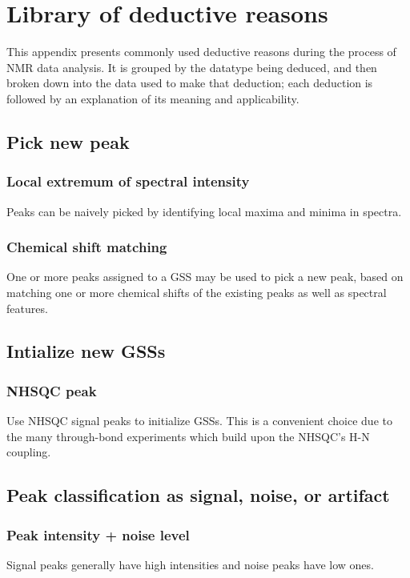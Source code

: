\chapter{Library of deductive reasons}
\label{sec_library}

This appendix presents commonly used deductive reasons during the process
of NMR data analysis.  It is grouped by the datatype being deduced, and then
broken down into the data used to make that deduction; each deduction is 
followed by an explanation of its meaning and applicability.


\section*{Pick new peak}

\subsection*{Local extremum of spectral intensity}
Peaks can be naively picked by identifying local maxima and minima in spectra.

\subsection*{Chemical shift matching}
One or more peaks assigned to a GSS may be used to pick a new peak,
based on matching one or more chemical shifts of the existing peaks
as well as spectral features.



\section*{Intialize new GSSs}

\subsection*{NHSQC peak}
Use NHSQC signal peaks to initialize GSSs.  This is a convenient choice due
to the many through-bond experiments which build upon the NHSQC's H-N coupling.



\section*{Peak classification as signal, noise, or artifact}

\subsection*{Peak intensity + noise level}
Signal peaks generally have high intensities and noise peaks have low ones.

